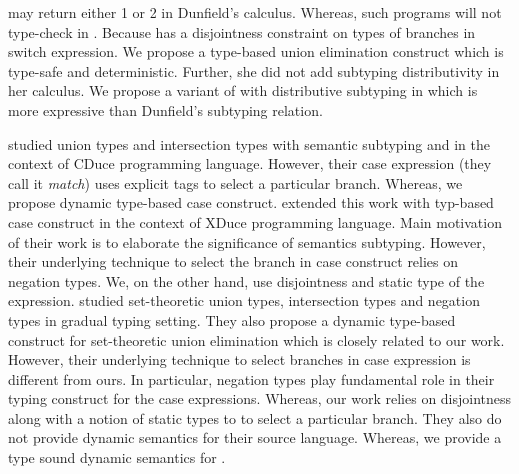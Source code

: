 \noindent may return either 1 or 2 in Dunfield's calculus.
Whereas, such programs will not
type-check in \cal. Because \cal has a disjointness constraint on
types of branches in switch expression.
We propose a type-based union elimination construct which is
type-safe and deterministic.
Further, she did not add subtyping distributivity in her calculus.
We propose a variant of \cal with distributive subtyping in 
which is more expressive than Dunfield's subtyping relation.

\cite{frisch2002semantic} studied union types and intersection types
with semantic subtyping and in the context of CDuce programming language.
However, their case expression (they call it \emph{match}) uses explicit
tags to select a particular branch. Whereas, we propose dynamic type-based
case construct.
\cite{castagna2005gentle} extended this work with typ-based case construct
in the context of XDuce programming language. Main motivation of their
work is to elaborate the significance of semantics subtyping.
However, their underlying technique to select the branch in case construct
relies on negation types. We, on the other hand, use disjointness
and static type of the expression. 
\citet{castagna2017gradual} studied
set-theoretic union types, intersection types and negation types
in gradual typing setting. They also propose a dynamic type-based
construct for set-theoretic union elimination which is closely
related to our work.
However, their underlying technique to select branches in case
expression is different from ours.
In particular, negation types play fundamental role in their
typing construct for the case expressions.
Whereas, our work relies on disjointness along with a notion of 
static types to to select a particular branch.
They also do not provide dynamic semantics for their source language.
Whereas, we provide a type sound dynamic semantics for \cal.

